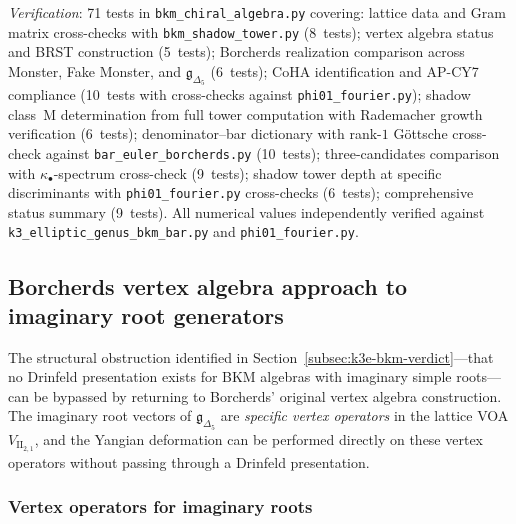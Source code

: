 \noindent\textit{Verification}: 71 tests in \texttt{bkm\_chiral\_algebra.py} covering: lattice data and Gram matrix cross-checks with \texttt{bkm\_shadow\_tower.py} (8~tests); vertex algebra status and BRST construction (5~tests); Borcherds realization comparison across Monster, Fake Monster, and $\mathfrak{g}_{\Delta_5}$ (6~tests); CoHA identification and AP-CY7 compliance (10~tests with cross-checks against \texttt{phi01\_fourier.py}); shadow class~M determination from full tower computation with Rademacher growth verification (6~tests); denominator--bar dictionary with rank-$1$ G\"ottsche cross-check against \texttt{bar\_euler\_borcherds.py} (10~tests); three-candidates comparison with $\kappa_\bullet$-spectrum cross-check (9~tests); shadow tower depth at specific discriminants with \texttt{phi01\_fourier.py} cross-checks (6~tests); comprehensive status summary (9~tests). All numerical values independently verified against \texttt{k3\_elliptic\_genus\_bkm\_bar.py} and \texttt{phi01\_fourier.py}.

\subsection{Borcherds vertex algebra approach to imaginary root generators}
\label{subsec:k3e-borcherds-vertex-yangian}

The structural obstruction identified in Section~\ref{subsec:k3e-bkm-verdict}---that no Drinfeld presentation exists for BKM algebras with imaginary simple roots---can be bypassed by returning to Borcherds' original vertex algebra construction. The imaginary root vectors of $\mathfrak{g}_{\Delta_5}$ are \emph{specific vertex operators} in the lattice VOA $V_{\mathrm{II}_{2,1}}$, and the Yangian deformation can be performed directly on these vertex operators without passing through a Drinfeld presentation.

\subsubsection{Vertex operators for imaginary roots}
\label{subsubsec:k3e-vertex-ops-imaginary}

